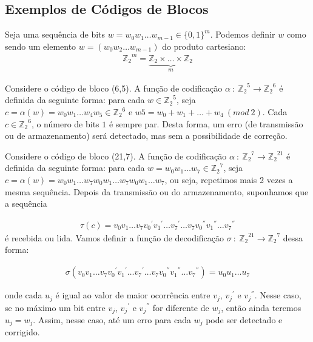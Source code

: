 \subsection{Exemplos de Códigos de Blocos}

\begin{definition} Seja uma sequência de bits $w=w_0w_1 \ldots w_{m-1} \in \{0, 1\}^m$. Podemos definir $w$ como sendo um elemento $w=(w_0w_2 \ldots w_{m-1})$ do produto cartesiano:
\begin{align*}
{\mathbb{Z}_2}^m=\underbrace{\mathbb{Z}_2 \times \ldots \times \mathbb{Z}_2}_{m}
\end{align*}
\end{definition}

\begin{example} Considere o código de bloco (6,5). A função de codificação $\alpha\ :\ {\mathbb{Z}_2}^5 \rightarrow {\mathbb{Z}_2}^6$ é definida da seguinte forma: para cada $w \in {\mathbb{Z}_2}^5$, seja $c=\alpha(w)=w_0w_1 \ldots w_4w_5 \in {\mathbb{Z}_2}^6$ e $w5=w_0+w_1+ \ldots +w_4\ (mod\ 2)$. Cada $c \in {\mathbb{Z}_2}^6$, o número de bits $1$ é sempre par. Desta forma, um erro (de transmissão ou de armazenamento) será detectado, mas sem a possibilidade de correção.
\end{example}

\begin{example} Considere o código de bloco (21,7). A função de codificação $\alpha\ :\ {\mathbb{Z}_2}^7 \rightarrow {\mathbb{Z}_2}^{21}$ é definida da seguinte forma: para cada $w=w_0w_1 \ldots w_7 \in {\mathbb{Z}_2}^7$, seja $c=\alpha(w)=w_0w_1 \ldots w_7w_0w_1 \ldots w_7w_0w_1 \ldots w_7$, ou seja, repetimos mais 2 vezes a mesma sequência. Depois da transmissão ou do armazenamento, suponhamos que a sequência

\begin{align*}
\tau(c)=v_0v_1 \ldots v_7{v_0}^{'}{v_1}^{'} \ldots {v_7}^{'} \ldots v_7{v_0}^{''}{v_1}^{''} \ldots {v_7}^{''}
\end{align*}
é recebida ou lida. Vamos definir a função de decodificação $\sigma\ :\ {\mathbb{Z}_2}^{21} \rightarrow {\mathbb{Z}_2}^7$ dessa forma:

\begin{align*}
\sigma(v_0v_1 \ldots v_7{v_0}^{'}{v_1}^{'} \ldots {v_7}^{'} \ldots v_7{v_0}^{''}{v_1}^{''} \ldots {v_7}^{''})=u_0u_1 \ldots u_7
\end{align*}

onde cada $u_j$ é igual ao valor de maior ocorrência entre $v_j$, ${v_j}^{'}$ e ${v_j}^{''}$. Nesse caso, se no máximo um bit entre $v_j$, ${v_j}^{'}$ e ${v_j}^{''}$ for diferente de $w_j$, então ainda teremos $u_j=w_j$. Assim, nesse caso, até um erro para cada $w_j$ pode ser detectado e corrigido.

\end{example}

